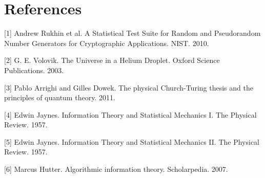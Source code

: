 \documentclass{article}
\begin{document}
\section*{References}

\small

[1] Andrew Rukhin et al. A Statistical Test Suite for Random and Pseudorandom Number Generators for Cryptographic Applications. NIST. 2010.

[2] G. E. Volovik. The Universe in a Helium Droplet. Oxford Science Publications. 2003.

[3] Pablo Arrighi and Gilles Dowek. The physical Church-Turing thesis and the principles of quantum theory. 2011.

[4] Edwin Jaynes. Information Theory and Statistical Mechanics I. The Physical Review. 1957.

[5] Edwin Jaynes. Information Theory and Statistical Mechanics II. The Physical Review. 1957.

[6] Marcus Hutter. Algorithmic information theory. Scholarpedia. 2007.
\end{document}
